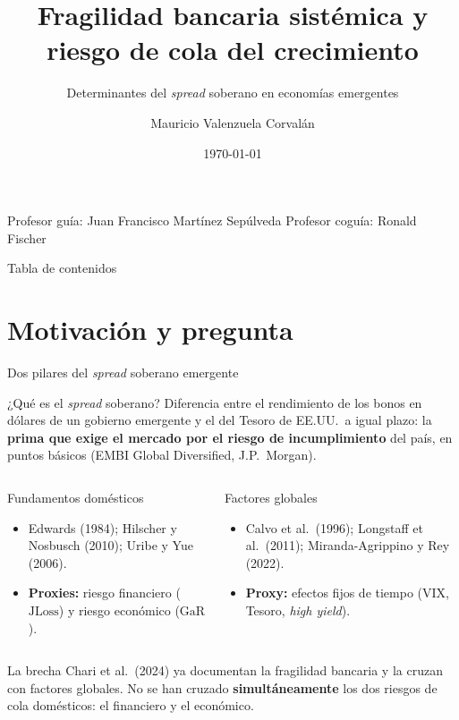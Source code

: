 \documentclass[aspectratio=169]{beamer}
\author{Mauricio Valenzuela Corvalán}
\institute[Universidad de Chile]{Departamento de Ingeniería Civil Industrial\\
\small Magíster en Economía Aplicada · Universidad de Chile}
\title[Fragilidad bancaria y riesgo de cola]{Fragilidad bancaria sistémica y riesgo de cola del crecimiento}
\subtitle{Determinantes del \textit{spread} soberano en economías emergentes}
\date{\today}
\newcommand{\JLoss}{\mathrm{JLoss}}
\newcommand{\GaR}{\mathrm{GaR}}
\begin{document}
\begin{frame}
\titlepage
\vspace{-8pt}
\centering
\footnotesize Profesor guía: Juan Francisco Martínez Sepúlveda \quad\quad
Profesor coguía: Ronald Fischer
\end{frame}

\begin{frame}{Tabla de contenidos}
\tableofcontents[sectionstyle=show,subsectionstyle=hide]
\end{frame}

\section{Motivación y pregunta}

\begin{frame}{Dos pilares del \textit{spread} soberano emergente}
\begin{exampleblock}{¿Qué es el \textit{spread} soberano?}
\footnotesize Diferencia entre el rendimiento de los bonos en dólares de un gobierno emergente y el del Tesoro de EE.UU.\ a igual plazo: la \textbf{prima que exige el mercado por el riesgo de incumplimiento} del país, en puntos básicos (EMBI Global Diversified, J.P.\ Morgan).
\end{exampleblock}
\vspace{-10pt}
\begin{columns}[T]
\begin{block}{Fundamentos domésticos}
\footnotesize
\begin{itemize}
\item Edwards (1984); Hilscher y Nosbusch (2010); Uribe y Yue (2006).
\item \textbf{Proxies:} riesgo financiero ($\JLoss$) y riesgo económico ($\GaR$).
\end{itemize}
\end{block}
\begin{block}{Factores globales}
\footnotesize
\begin{itemize}
\item Calvo et al.\ (1996); Longstaff et al.\ (2011); Miranda-Agrippino y Rey (2022).
\item \textbf{Proxy:} efectos fijos de tiempo (VIX, Tesoro, \textit{high yield}).
\end{itemize}
\end{block}
\end{columns}
\begin{alertblock}{La brecha}
\footnotesize Chari et al.\ (2024) ya documentan la fragilidad bancaria y la cruzan con factores globales. No se han cruzado \textbf{simultáneamente} los dos riesgos de cola domésticos: el financiero y el económico.
\end{alertblock}
\end{frame}
\end{document}
